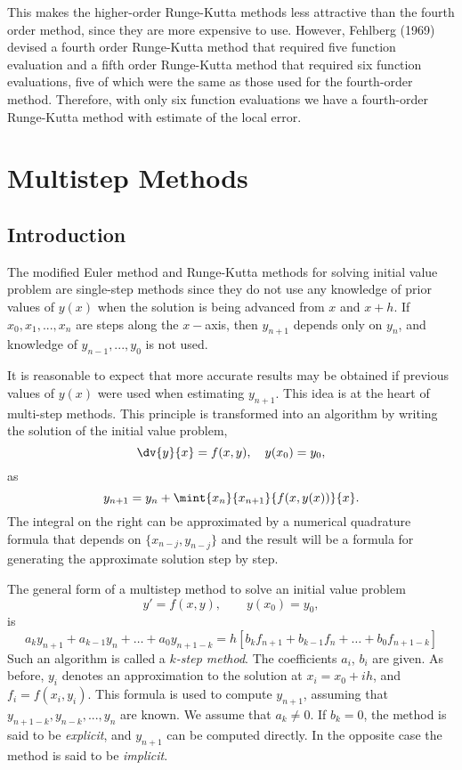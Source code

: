\noindent
This makes the higher-order Runge-Kutta methods less attractive than
the fourth order method, since they are more expensive to use.
However, Fehlberg (1969) devised a fourth order Runge-Kutta method
that required five function evaluation and a fifth order Runge-Kutta
method that required six function evaluations, five of which were the
same as those used for the fourth-order method.  Therefore, with only
six function evaluations we have a fourth-order Runge-Kutta method
with estimate of the local error.

\section{Multistep Methods}

\subsection{Introduction}

The modified Euler method and Runge-Kutta methods for solving initial
value problem are single-step methods since they do not use any
knowledge of prior values of $y(x)$ when the solution is being
advanced from $x$ and $x+h$. If $x_0,x_1,...,x_n$ are steps along the
$x-$axis, then $y_{n+1}$ depends only on $y_n$, and knowledge of
$y_{n-1},...,y_0$ is not used.

It is reasonable to expect that more accurate results may be obtained
if previous values of $y(x)$ were used when estimating $y_{n+1}$.
This idea is at the heart of multi-step methods.  This principle is
transformed into an algorithm by writing the solution of the initial
value problem,
%
\begin{equation}
  \dv{y}{x} = f(x,y), \quad y(x_0)=y_0,
  \label{IVP.eq:25}
\end{equation}
%
as
%
\begin{equation}
  y_{n+1} = y_n + \mint{x_n}{x_{n+1}}{f(x,y(x))}{x}.
  \label{IVP.eq:24}
\end{equation}
%
The integral on the right can be approximated by a numerical
quadrature formula that depends on $\{ x_{n-j}, y_{n-j} \}$ and the
result will be a formula for generating the approximate solution step
by step.

The general form of a multistep method to solve an initial value problem
%
\begin{equation}
  y' = f(x,y), \qquad y(x_0) = y_0 ,
  \label{IVP.eq:44}
\end{equation}
%
is
%
\begin{equation}
  a_k y_{n+1} + a_{k-1} y_{n} + \ldots  + a_0 y_{n+1-k} =
  h [ b_k f_{n+1} + b_{k-1} f_{n} + \ldots + b_0 f_{n+1-k}]
  \label{IVP.eq:45}
\end{equation}
%
Such an algorithm is called a \textit{$k$-step method}. The
coefficients $a_i$, $b_i$ are given. As before, $y_i$ denotes an
approximation to the solution at $x_i=x_0+ih$, and
$f_i=f(x_i,y_i)$. This formula is used to compute $y_{n+1}$, assuming
that $y_{n+1-k},y_{n-k},...,y_{n}$ are known. We assume that $a_k\ne
0$. If $b_k=0$, the method is said to be \textit{explicit}, and
$y_{n+1}$ can be computed directly. In the opposite case the method is
said to be \textit{implicit}.

